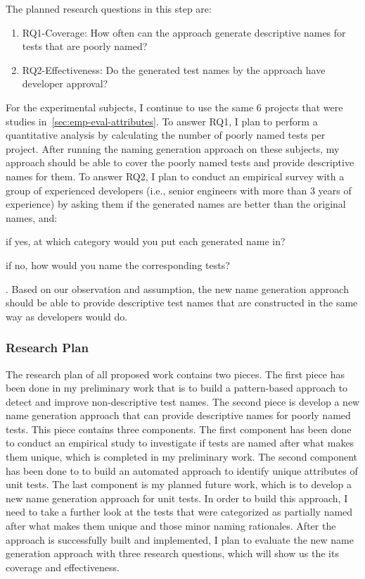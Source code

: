 The planned research questions in this step are:
%
\begin{enumerate}
    \item RQ1-Coverage: How often can the approach generate descriptive names for tests that are poorly named?
    \item RQ2-Effectiveness: Do the generated test names by the approach have developer approval?
\end{enumerate}
%
For the experimental subjects, I continue to use the same \num{6} projects that were studies in~\cref{sec:emp-eval-attributes}.
%
To answer RQ1, I plan to perform a quantitative analysis by calculating the number of poorly named tests per project.
%
After running the naming generation approach on these subjects, my approach should be able to cover the poorly named tests and provide descriptive names for them.
%
To answer RQ2, I plan to conduct an empirical survey with a group of experienced developers (i.e., senior engineers with more than \num{3} years of experience) by asking them if the generated names are better than the original names, and:
\begin{enumerate*}
    \item if yes, at which category would you put each generated name in?
    \item if no, how would you name the corresponding tests?
\end{enumerate*}.
%
Based on our observation and assumption, the new name generation approach should be able to provide descriptive test names that are constructed in the same way as developers would do. 

\subsubsection{Research Plan}

The research plan of all proposed work contains two pieces.
%
The first piece has been done in my preliminary work that is to build a pattern-based approach to detect and improve non-descriptive test names.
%
The second piece is develop a new name generation approach that can provide descriptive names for poorly named tests.
%
This piece contains three components.
%
The first component has been done to conduct an empirical study to investigate if tests are named after what makes them unique, which is completed in my preliminary work.
%
The second component has been done to to build an automated approach to identify unique attributes of unit tests.
%
The last component is my planned future work, which is to develop a new name generation approach for unit tests.
%
In order to build this approach, I need to take a further look at the tests that were categorized as partially named after what makes them unique and those minor naming rationales.
%
After the approach is successfully built and implemented, I plan to evaluate the new name generation approach with three research questions, which will show us the its coverage and effectiveness.